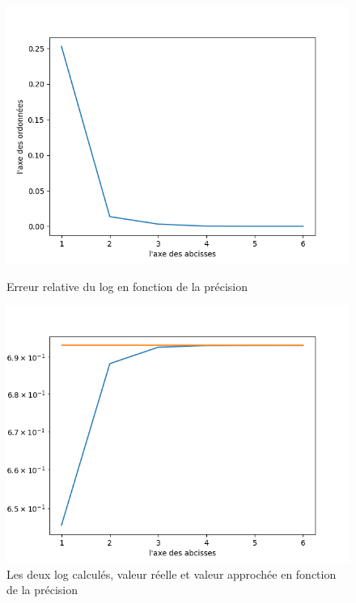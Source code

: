 \documentclass{article}
\begin{document}
\begin{figure}[!htb]
    \begin{minipage}{0.48\textwidth}
        \centering
        \includegraphics[scale=0.5]{erreur_relative.png}
        \caption{Erreur relative du log en fonction de la précision}
        \label{fig:log_prec}
    \end{minipage}\hfill
    \begin{minipage}{0.48\textwidth}
        \centering
        \includegraphics[scale=0.5]{graphes_log.png}
        \caption{Les deux log calculés, valeur réelle et valeur approchée en fonction de la précision}
        \label{fig:compare_log}
    \end{minipage}
\end{figure}
\end{document}
